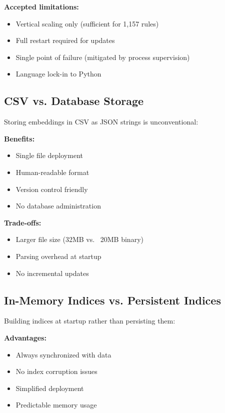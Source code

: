 \textbf{Accepted limitations:}
\begin{itemize}[leftmargin=*,itemsep=2pt,topsep=2pt]
  \item Vertical scaling only (sufficient for 1,157 rules)
  \item Full restart required for updates
  \item Single point of failure (mitigated by process supervision)
  \item Language lock-in to Python
\end{itemize}

\subsection{CSV vs. Database Storage}

Storing embeddings in CSV as JSON strings is unconventional:

\textbf{Benefits:}
\begin{itemize}[leftmargin=*,itemsep=2pt,topsep=2pt]
  \item Single file deployment
  \item Human-readable format
  \item Version control friendly
  \item No database administration
\end{itemize}

\textbf{Trade-offs:}
\begin{itemize}[leftmargin=*,itemsep=2pt,topsep=2pt]
  \item Larger file size (32MB vs. ~20MB binary)
  \item Parsing overhead at startup
  \item No incremental updates
\end{itemize}

\subsection{In-Memory Indices vs. Persistent Indices}

Building indices at startup rather than persisting them:

\textbf{Advantages:}
\begin{itemize}[leftmargin=*,itemsep=2pt,topsep=2pt]
  \item Always synchronized with data
  \item No index corruption issues
  \item Simplified deployment
  \item Predictable memory usage
\end{itemize}

